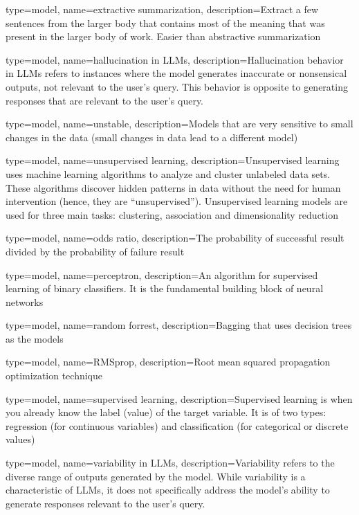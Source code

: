 {
	type=model,
    name=extractive summarization,
    description={Extract a few sentences from the larger body that contains most of the meaning that was present in the larger body of work.  Easier than abstractive summarization}
}


{
	type=model,
    name=hallucination in LLMs,
    description={Hallucination behavior in LLMs refers to instances where the model generates inaccurate or nonsensical outputs, not relevant to the user's query. This behavior is opposite to generating responses that are relevant to the user's query.}
}

{
	type=model,
    name=unstable,
    description={Models that are very sensitive to small changes in the data (small changes in data lead to a different model)}
}

{
	type=model,
    name=unsupervised learning,
    description={Unsupervised learning uses machine learning algorithms to analyze and cluster unlabeled data sets. These algorithms discover hidden patterns in data without the need for human intervention (hence, they are ``unsupervised'').  Unsupervised learning models are used for three main tasks: clustering, association and dimensionality reduction}
}

{
	type=model,
    name=odds ratio,
    description={The probability of successful result divided by the probability of failure result}
}

{
	type=model,
    name=perceptron,
    description={An algorithm for supervised learning of binary classifiers.  It is the fundamental building block of neural networks}
}

{
	type=model,
    name=random forrest,
    description={Bagging that uses decision trees as the models}
}

{
	type=model,
    name=RMSprop,
    description={Root mean squared propagation optimization technique}
}

{
	type=model,
    name=supervised learning,
    description={Supervised learning is when you already know the label (value) of the target variable. It is of two types: regression (for continuous variables) and classification (for categorical or discrete values)}
}

{
	type=model,
    name=variability in LLMs,
    description={Variability refers to the diverse range of outputs generated by the model. While variability is a characteristic of LLMs, it does not specifically address the model's ability to generate responses relevant to the user's query.}
} 